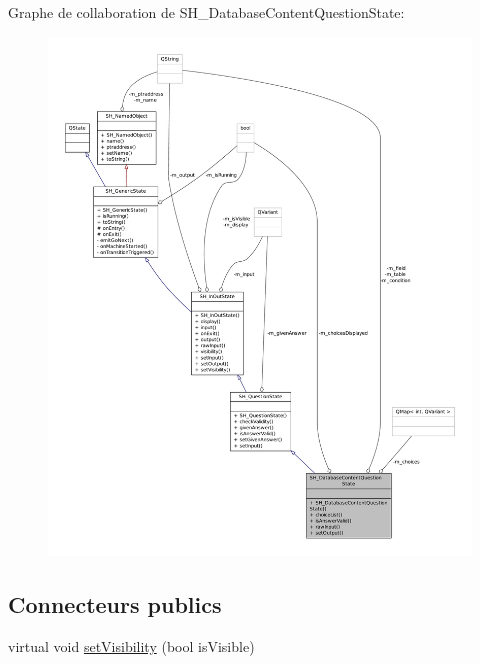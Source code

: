 Graphe de collaboration de S\-H\-\_\-\-Database\-Content\-Question\-State\-:
\nopagebreak
\begin{figure}[H]
\begin{center}
\leavevmode
\includegraphics[width=350pt]{classSH__DatabaseContentQuestionState__coll__graph}
\end{center}
\end{figure}
\subsection*{Connecteurs publics}
\begin{DoxyCompactItemize}
\item 
virtual void \hyperlink{classSH__InOutState_a7fdfaa6f600f0ac4a96f238a038ba9ad}{set\-Visibility} (bool is\-Visible)
\end{DoxyCompactItemize}
